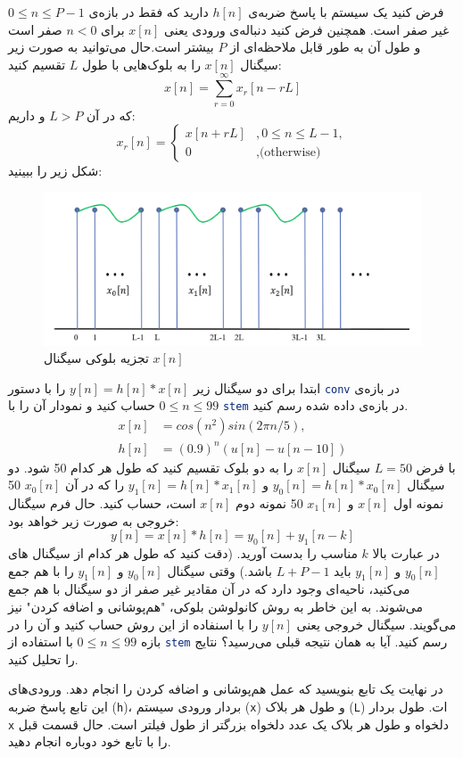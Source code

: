 \documentclass{utsignal}
\begin{document}
	فرض کنید یک سیستم با پاسخ ضربه‌ی $h[n]$ دارید که فقط در بازه‌ی $0\le n \le P-1$ غیر صفر است. همچنین فرض کنید دنباله‌ی ورودی یعنی $x[n]$ برای $n<0$ صفر است و طول آن به طور قابل ملاحظه‌ای از $P$ بیشتر است.حال می‌توانید به صورت زیر سیگنال $x[n]$ را به بلوک‌هایی با طول $L$ تقسیم کنید:
	$$
	x[n] = \sum_{r=0}^{\infty}x_r[n-rL]
	$$
	که در آن $L>P$ و داریم:
	$$
	x_r[n]=\begin{cases}
		x[n+rL]&, 0 \le n \le L-1,\\
		0&, \text{(otherwise)}
	\end{cases}
	$$
	شکل زیر را ببینید:
	\begin{figure}[h]
		\includegraphics[width=\linewidth]{segments.png}
		\caption{تجزیه بلوکی سیگنال $x[n]$}
	\end{figure}
	
	ابتدا برای دو سیگنال زیر $y[n]=h[n]*x[n]$ را با دستور \lstinline[language=Octave]{conv}  در بازه‌ی $0\le n \le 99$ حساب کنید و نمودار آن را با \lstinline[language=Octave]{stem} در بازه‌ی داده شده رسم کنید.
	\begin{align*}
	x[n] &= cos(n^2)sin(2\pi n/5),\\
	h[n]‌&= (0.9)^n(u[n]-u[n-10])
	\end{align*}
	با فرض $L=50$ سیگنال $x[n]$ را به دو بلوک تقسیم کنید که طول هر کدام 50 شود. دو سیگنال $y_0[n]=h[n]*x_0[n]$ و $y_1[n]=h[n]*x_1[n]$ را که در آن $x_0[n]$ 50 نمونه اول $x[n]$ و $x_1[n]$ 50 نمونه دوم $x[n]$ است، حساب کنید. حال فرم سیگنال خروجی به صورت زیر خواهد بود:
	$$y[n]=x[n]*h[n] = y_0[n] + y_1[n-k]$$
	در عبارت بالا $k$ مناسب را بدست آورید. (دقت کنید که طول هر کدام از سیگنال های $y_0[n]$ و $y_1[n]$ باید $L+P-1$ باشد.) وقتی سیگنال $y_0[n]$ و $y_1[n]$ را با هم جمع می‌کنید، ناحیه‌ای وجود دارد که در آن مقادیر غیر صفر از دو سیگنال با هم جمع می‌شوند. به این خاطر به روش کانولوشن بلوکی، "هم‌پوشانی و اضافه کردن" نیز می‌گویند. سیگنال خروجی یعنی $y[n]$ را با اسنفاده از این روش حساب کنید و آن را در بازه $0\le n \le 99$ با استفاده از \lstinline[language=Octave]{stem} رسم کنید. آیا به همان نتیجه قبلی می‌رسید؟ نتایج را تحلیل کنید.
	
	در نهایت یک تابع بنویسید که عمل هم‌پوشانی و اضافه کردن را انجام دهد. ورودی‌های این تابع پاسخ ضربه (\lstinline[language=Octave]{h})، بردار ورودی سیستم (\lstinline[language=Octave]{x}) و طول هر بلاک (\lstinline[language=Octave]{L}) ات. طول بردار \lstinline[language=Octave]{x} دلخواه و طول هر بلاک یک عدد دلخواه بزرگتر از طول فیلتر است. حال قسمت قبل را با تابع خود دوباره انجام دهید.
	
\end{document}
